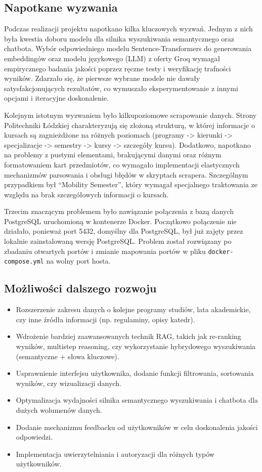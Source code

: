 \documentclass{article}
\begin{document}
\subsection{Napotkane wyzwania}
Podczas realizacji projektu napotkano kilka kluczowych wyzwań. Jednym z nich była kwestia doboru modelu dla silnika wyszukiwania semantycznego oraz chatbota. Wybór odpowiedniego modelu Sentence-Transformers do generowania embeddingów oraz modelu językowego (LLM) z oferty Groq wymagał empirycznego badania jakości poprzez ręczne testy i weryfikację trafności wyników. Zdarzało się, że pierwsze wybrane modele nie dawały satysfakcjonujących rezultatów, co wymuszało eksperymentowanie z innymi opcjami i iteracyjne doskonalenie.

Kolejnym istotnym wyzwaniem było kilkupoziomowe scrapowanie danych. Strony Politechniki Łódzkiej charakteryzują się złożoną strukturą, w której informacje o kursach są zagnieżdżone na różnych poziomach (programy -> kierunki -> specjalizacje -> semestry -> kursy -> szczegóły kursu). Dodatkowo, napotkano na problemy z pustymi elementami, brakującymi danymi oraz różnym formatowaniem kart przedmiotów, co wymagało implementacji elastycznych mechanizmów parsowania i obsługi błędów w skryptach scrapera. Szczególnym przypadkiem był ``Mobility Semester'', który wymagał specjalnego traktowania ze względu na brak szczegółowych informacji o kursach.

Trzecim znaczącym problemem było nawiązanie połączenia z bazą danych PostgreSQL uruchomioną w kontenerze Docker. Początkowo połączenie nie działało, ponieważ port 5432, domyślny dla PostgreSQL, był już zajęty przez lokalnie zainstalowaną wersję PostgreSQL. Problem został rozwiązany po zbadaniu otwartych portów i zmianie mapowania portów w pliku \texttt{docker-compose.yml} na wolny port hosta.

\subsection{Możliwości dalszego rozwoju}
\begin{itemize}
    \item Rozszerzenie zakresu danych o kolejne programy studiów, lata akademickie, czy inne źródła informacji (np. regulaminy, opisy katedr).
    \item Wdrożenie bardziej zaawansowanych technik RAG, takich jak re-ranking wyników, multistep reasoning, czy wykorzystanie hybrydowego wyszukiwania (semantyczne + słowa kluczowe).
    \item Usprawnienie interfejsu użytkownika, dodanie funkcji filtrowania, sortowania wyników, czy wizualizacji danych.
    \item Optymalizacja wydajności silnika semantycznego wyszukiwania i chatbota dla dużych wolumenów danych.
    \item Dodanie mechanizmu feedbacku od użytkowników w celu doskonalenia jakości odpowiedzi.
    \item Implementacja uwierzytelniania i autoryzacji dla różnych typów użytkowników.
\end{itemize}
\end{document}
